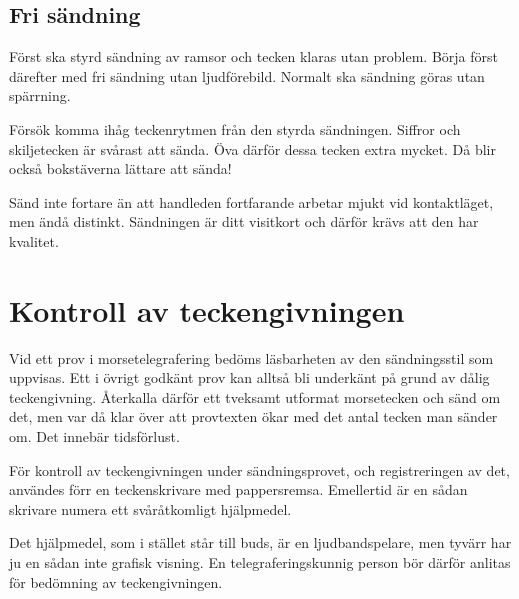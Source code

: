 \subsection{Fri sändning}

Först ska styrd sändning av ramsor och tecken klaras utan problem.
Börja först därefter med fri sändning utan ljudförebild.
Normalt ska sändning göras utan spärrning.

Försök komma ihåg teckenrytmen från den styrda sändningen.
Siffror och skiljetecken är svårast att sända.
Öva därför dessa tecken extra mycket.
Då blir också bokstäverna lättare att sända!

Sänd inte fortare än att handleden fortfarande arbetar mjukt vid kontaktläget,
men ändå distinkt.
Sändningen är ditt visitkort och därför krävs att den har kvalitet.


\section[Teckengivning]{Kontroll av teckengivningen}

Vid ett prov i morsetelegrafering bedöms läsbarheten av den sändningsstil som
uppvisas.
Ett i övrigt godkänt prov kan alltså bli underkänt på grund av dålig
teckengivning.
Återkalla därför ett tveksamt utformat morsetecken och sänd om det, men var då
klar över att provtexten ökar med det antal tecken man sänder om.
Det innebär tidsförlust.

För kontroll av teckengivningen under sändningsprovet, och registreringen av
det, användes förr en teckenskrivare med pappersremsa.
Emellertid är en sådan skrivare numera ett svåråtkomligt hjälpmedel.

Det hjälpmedel, som i stället står till buds, är en ljudbandspelare, men tyvärr
har ju en sådan inte grafisk visning.
En telegraferingskunnig person bör därför anlitas för bedömning av
teckengivningen.

